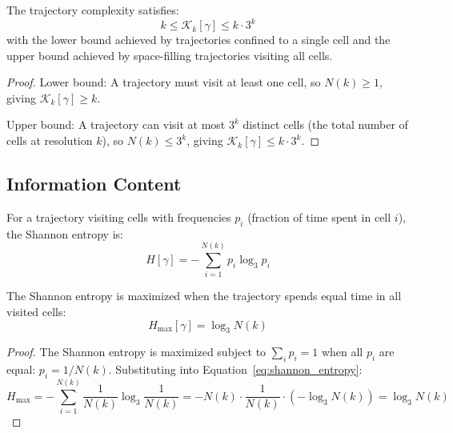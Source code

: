 \begin{theorem}
\label{thm:complexity_bounds}
The trajectory complexity satisfies:
\begin{equation}
k \leq \mathcal{K}_k[\gamma] \leq k \cdot 3^k
\label{eq:complexity_bounds}
\end{equation}
with the lower bound achieved by trajectories confined to a single cell and the upper bound achieved by space-filling trajectories visiting all cells.
\end{theorem}

\begin{proof}
Lower bound: A trajectory must visit at least one cell, so $N(k) \geq 1$, giving $\mathcal{K}_k[\gamma] \geq k$.

Upper bound: A trajectory can visit at most $3^k$ distinct cells (the total number of cells at resolution $k$), so $N(k) \leq 3^k$, giving $\mathcal{K}_k[\gamma] \leq k \cdot 3^k$.
\end{proof}

\subsection{Information Content}

\begin{definition}
\label{def:shannon_entropy_trajectory}
For a trajectory visiting cells with frequencies $p_i$ (fraction of time spent in cell $i$), the Shannon entropy is:
\begin{equation}
H[\gamma] = -\sum_{i=1}^{N(k)} p_i \log_3 p_i
\label{eq:shannon_entropy}
\end{equation}
\end{definition}

\begin{theorem}
\label{thm:maximum_entropy}
The Shannon entropy is maximized when the trajectory spends equal time in all visited cells:
\begin{equation}
H_{\max}[\gamma] = \log_3 N(k)
\label{eq:maximum_entropy}
\end{equation}
\end{theorem}

\begin{proof}
The Shannon entropy is maximized subject to $\sum_i p_i = 1$ when all $p_i$ are equal: $p_i = 1/N(k)$. Substituting into Equation~\eqref{eq:shannon_entropy}:
\begin{equation}
H_{\max} = -\sum_{i=1}^{N(k)} \frac{1}{N(k)} \log_3 \frac{1}{N(k)} = -N(k) \cdot \frac{1}{N(k)} \cdot (-\log_3 N(k)) = \log_3 N(k)
\end{equation}
\end{proof}

